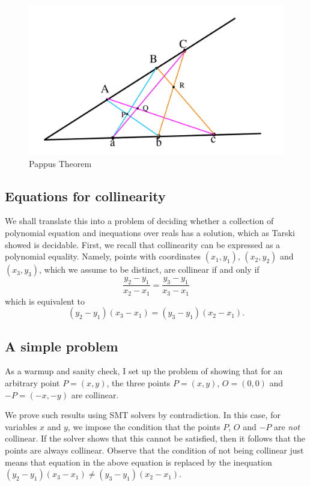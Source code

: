 \documentclass{amsart}
\theoremstyle{plain}
\theoremstyle{definition}
\theoremstyle{remark}
\begin{document}
\begin{figure}
	\centering
	\includegraphics[scale=0.3]{Pappus.png}
	\caption{Pappus Theorem}
\end{figure}

\hypertarget{equations-for-collinearity}{%
	\subsection{Equations for
		collinearity}\label{equations-for-collinearity}}

We shall translate this into a problem of deciding whether a collection
of polynomial equation and inequations over reals has a solution, which
as Tarski showed is decidable. First, we recall that collinearity can be
expressed as a polynomial equality. Namely, points with coordinates
\((x_1, y_1)\), \((x_2, y_2)\) and \((x_3, y_3)\), which we assume to be
distinct, are collinear if and only if
\[\frac{y_2 - y_1}{x_2 - x_1} = \frac{y_3 - y_1}{x_3 - x_1}\] which is
equivalent to \[(y_2 - y_1)(x_3 - x_1) = (y_3 - y_1)(x_2 - x_1).\]

\hypertarget{a-simple-problem}{%
	\subsection{A simple problem}\label{a-simple-problem}}

As a warmup and sanity check, I set up the problem of showing that for
an arbitrary point \(P = (x, y)\), the three points \(P=(x, y)\),
\(O=(0, 0)\) and \(-P=(-x, -y)\) are collinear.

We prove such results using SMT solvers by contradiction. In this case,
for variables \(x\) and \(y\), we impose the condition that the points
\(P\), \(O\) and \(-P\) are \emph{not} collinear. If the solver shows
that this cannot be satisfied, then it follows that the points are
always collinear. Observe that the condition of not being collinear just
means that equation in the above equation is replaced by the inequation
\((y_2 - y_1)(x_3 - x_1) \neq (y_3 - y_1)(x_2 - x_1)\).
\end{document}
